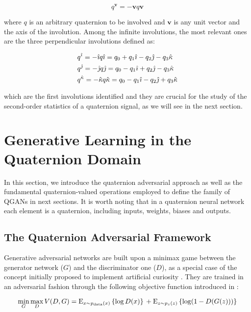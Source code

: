 \documentclass[graybox]{svmult}
\begin{document}
\begin{equation}
    q^{\mathbf{v}} = - \mathbf{v} q \mathbf{v}
\end{equation}

\noindent where $q$ is an arbitrary quaternion to be involved and $\mathbf{v}$ is any unit vector and the axis of the involution. Among the infinite involutions, the most relevant ones are the three perpendicular involutions defined as:

\begin{equation}
    \begin{split}
        &q^{\hat{\imath}} = -{\hat{\imath}} q {\hat{\imath}} = q_0 + q_1 {\hat{\imath}} - q_2 {\hat{\jmath}} - q_3 {\hat{\kappa}} \\
        &q^{\hat{\jmath}} = -{\hat{\jmath}} q {\hat{\jmath}} = q_0 - q_1 {\hat{\imath}} + q_2 {\hat{\jmath}} - q_3 {\hat{\kappa}} \\
        &q^{\hat{\kappa}} = -{\hat{\kappa}} q {\hat{\kappa}} = q_0 - q_1 {\hat{\imath}} - q_2 {\hat{\jmath}} + q_3 {\hat{\kappa}}
    \end{split}
\label{eq:inv}
\end{equation}

\noindent which are the first involutions identified \cite{Chernov1995} and they are crucial for the study of the second-order statistics of a quaternion signal, as we will see in the next section.

\section{Generative Learning in the Quaternion Domain}
\label{sec:qlearn}
In this section, we introduce the quaternion adversarial approach as well as the fundamental quaternion-valued operations employed to define the family of QGANs in next sections. It is worth noting that in a quaternion neural network each element is a quaternion, including inputs, weights, biases and outputs.

\subsection{The Quaternion Adversarial Framework}

\noindent Generative adversarial networks are built upon a minimax game between the generator network ($G$) and the discriminator one ($D$), as a special case of the concept initially proposed to implement artificial curiosity \cite{SchmidhuberMIT1991, SchmidhuberNEUNET2020}. They are trained in an adversarial fashion through the following objective function introduced in \cite{GoodfellowNIPS2014}:

\begin{equation}
\label{eq:gan_loss}
    \min_{G}\max_{D} V(D,G) = \text{E}_{x\sim p_{\text{data}}(x)}\left\{\log D(x)\right\} \\
    + \text{E}_{z\sim p_z(z)}\left\{\log (1-D(G(z)))\right\}
\end{equation}
\end{document}
